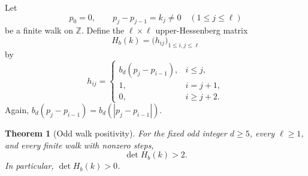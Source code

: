 \documentclass[a4paper,11pt]{amsart}
\newtheorem{theorem}{Theorem}[section]
\theoremstyle{remark}
\newcommand{\Z}{\mathbb Z}
\numberwithin{equation}{section}
\begin{document}
Let
\[
        p_0=0,
        \qquad
        p_j-p_{j-1}=k_j\ne0
        \quad(1\le j\le\ell)
\]
be a finite walk on \(\Z\).  Define the \(\ell\times\ell\) upper-Hessenberg matrix
\[
        H_b(k)=\bigl(h_{ij}\bigr)_{1\le i,j\le \ell}
\]
by
\[
        h_{ij}
        =
        \begin{cases}
        b_d(p_j-p_{i-1}),&i\le j,\\
        1,&i=j+1,\\
        0,&i\ge j+2.
        \end{cases}
\]
Again, \(b_d(p_j-p_{i-1})=b_d(|p_j-p_{i-1}|)\).

\begin{theorem}[Odd walk positivity]\label{thm:walk-positive}
For the fixed odd integer \(d\ge5\), every \(\ell\ge1\), and every finite walk with nonzero steps,
\[
        \det H_b(k)>2.
\]
In particular, \(\det H_b(k)>0\).
\end{theorem}
\end{document}
